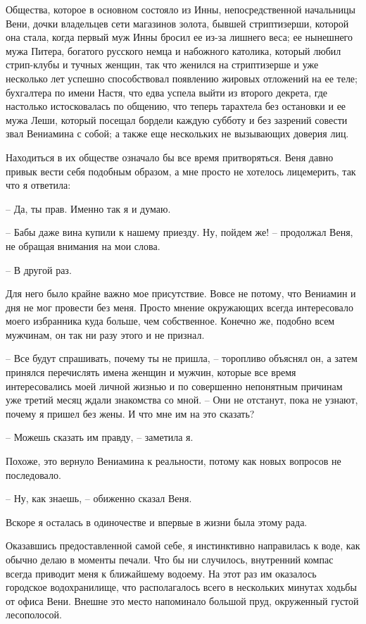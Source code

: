 \documentclass[
]{book}
\begin{document}
Общества, которое в основном состояло из Инны, непосредственной начальницы Вени, дочки владельцев сети магазинов золота, бывшей стриптизерши, которой она стала, когда первый муж Инны бросил ее из-за лишнего веса; ее нынешнего мужа Питера, богатого русского немца и набожного католика, который любил стрип-клубы и тучных женщин, так что женился на стриптизерше и уже несколько лет успешно способствовал появлению жировых отложений на ее теле; бухгалтера по имени Настя, что едва успела выйти из второго декрета, где настолько истосковалась по общению, что теперь тарахтела без остановки и ее мужа Леши, который посещал бордели каждую субботу и без зазрений совести звал Вениамина с собой; а также еще нескольких не вызывающих доверия лиц.

Находиться в их обществе означало бы все время притворяться. Веня давно привык вести себя подобным образом, а мне просто не хотелось лицемерить, так что я ответила:

-- Да, ты прав. Именно так я и думаю.

-- Бабы даже вина купили к нашему приезду. Ну, пойдем же! -- продолжал Веня, не обращая внимания на мои слова.

-- В другой раз.

Для него было крайне важно мое присутствие. Вовсе не потому, что Вениамин и дня не мог провести без меня. Просто мнение окружающих всегда интересовало моего избранника куда больше, чем собственное. Конечно же, подобно всем мужчинам, он так ни разу этого и не признал.

-- Все будут спрашивать, почему ты не пришла, -- торопливо объяснял он, а затем принялся перечислять имена женщин и мужчин, которые все время интересовались моей личной жизнью и по совершенно непонятным причинам уже третий месяц ждали знакомства со мной. -- Они не отстанут, пока не узнают, почему я пришел без жены. И что мне им на это сказать?

-- Можешь сказать им правду, -- заметила я.

Похоже, это вернуло Вениамина к реальности, потому как новых вопросов не последовало.

-- Ну, как знаешь, -- обиженно сказал Веня.

Вскоре я осталась в одиночестве и впервые в жизни была этому рада.

Оказавшись предоставленной самой себе, я инстинктивно направилась к воде, как обычно делаю в моменты печали. Что бы ни случилось, внутренний компас всегда приводит меня к ближайшему водоему. На этот раз им оказалось городское водохранилище, что располагалось всего в нескольких минутах ходьбы от офиса Вени. Внешне это место напоминало большой пруд, окруженный густой лесополосой.
\end{document}
